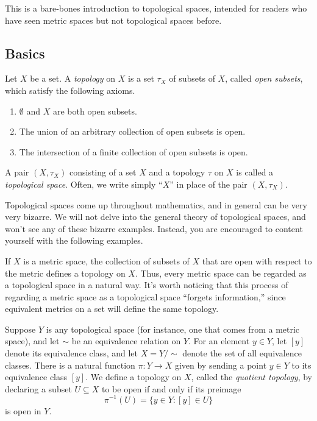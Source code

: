 This is a bare-bones introduction to topological spaces, intended for readers who have seen metric spaces but not topological spaces before. 

\subsection{Basics} \label{topological-spaces-basics}

\begin{definition}
	Let $X$ be a set. A \emph{topology} on $X$ is a set $\tau_X$ of subsets of $X$, called \emph{open subsets}, which satisfy the following axioms.
	\begin{enumerate}[(T1)]
		\item $\emptyset$ and $X$ are both open subsets. 
		\item The union of an arbitrary collection of open subsets is open. 
		\item The intersection of a finite collection of open subsets is open. 
	\end{enumerate}
	A pair $(X, \tau_X)$ consisting of a set $X$ and a topology $\tau$ on $X$ is called a \emph{topological space}. Often, we write simply ``$X$'' in place of the pair $(X, \tau_X)$. 
\end{definition}

Topological spaces come up throughout mathematics, and in general can be very very bizarre. We will not delve into the general theory of topological spaces, and won't see any of these bizarre examples. Instead, you are encouraged to content yourself with the following examples. 

\begin{example} \label{metric-to-topological}
	If $X$ is a metric space, the collection of subsets of $X$ that are open with respect to the metric defines a topology on $X$. Thus, every metric space can be regarded as a topological space in a natural way. It's worth noticing that this process of regarding a metric space as a topological space ``forgets information,'' since equivalent metrics on a set will define the same topology. 
\end{example}

\begin{example} \label{quotient-space}
	Suppose $Y$ is any topological space (for instance, one that comes from a metric space), and let $\sim$ be an equivalence relation on $Y$. For an element $y \in Y$, let $[y]$ denote its equivalence class, and let $X = Y/\sim$ denote the set of all equivalence classes. There is a natural function $\pi : Y \to X$ given by sending a point $y \in Y$ to its equivalence class $[y]$. We define a topology on $X$, called the \emph{quotient topology}, by declaring a subset $U \subseteq X$ to be open if and only if its preimage \[ \pi^{-1}(U) = \{ y \in Y : [y] \in U \} \] is open in $Y$. 
\end{example}

